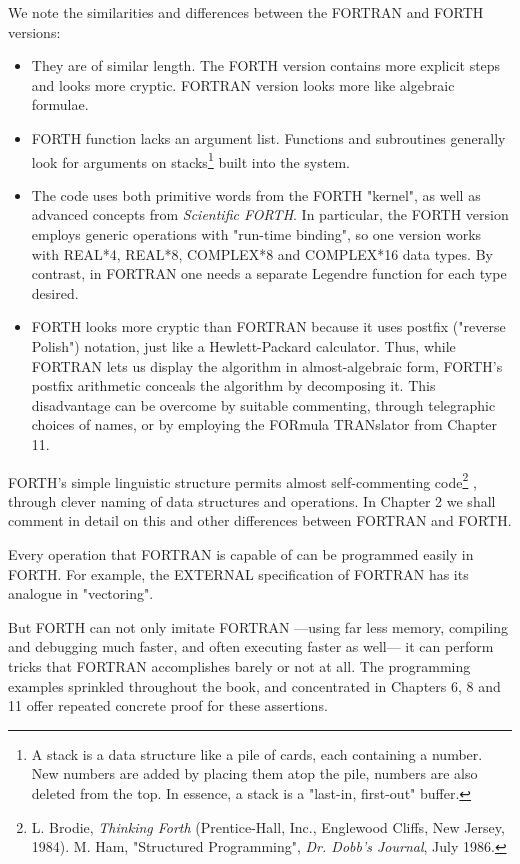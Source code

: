 We note the similarities and differences between the FORTRAN and FORTH versions:

\begin{itemize}
    \item They are of similar length. The FORTH version contains more explicit steps and looks more cryptic. FORTRAN version looks more like algebraic formulae.
    \item FORTH function lacks an argument list. Functions and subroutines generally look for arguments on stacks\footnote{A stack is a data structure like a pile of cards, each containing a number. New numbers are added by placing them atop the pile, numbers are also deleted from the top. In essence, a stack is a "last-in, first-out" buffer.} built into 
the system.
    \item The code uses both primitive words from the FORTH "kernel", as well as advanced concepts from \textit{Scientific FORTH}. In particular, the FORTH version employs generic operations with "run-time binding", so one version works with REAL*4, REAL*8, COMPLEX*8 and COMPLEX*16 data types. By contrast, in FORTRAN one needs a separate Legendre function for each type desired.
    \item FORTH looks more cryptic than FORTRAN because it uses postfix ("reverse Polish") notation, just like a Hewlett-Packard calculator. Thus, while FORTRAN lets us display the algorithm in almost-algebraic form, FORTH's postfix arithmetic conceals the algorithm by decomposing it. This disadvantage can be overcome by suitable commenting, through telegraphic choices of names, or by employing the FORmula TRANslator from Chapter 11.
\end{itemize}

FORTH's simple linguistic structure permits almost self-commenting code\footnote{L. Brodie, \textit{Thinking Forth} (Prentice-Hall, Inc., Englewood Cliffs, New Jersey, 1984). M. Ham, "Structured Programming", \textit{Dr. Dobb's Journal}, July 1986.} , through clever naming of data structures and operations. In Chapter 2 we shall comment in detail on this and other differences between FORTRAN and FORTH.
 
Every operation that FORTRAN is capable of can be programmed easily in FORTH. For example, the EXTERNAL specification of FORTRAN has its analogue in "vectoring".

But FORTH can not only imitate FORTRAN —using far less memory, compiling and debugging much faster, and often executing faster as well— it can perform tricks that FORTRAN accomplishes barely or not at all. The programming examples sprinkled throughout the book, and concentrated in Chapters 6, 8 and 11 offer repeated concrete proof for these assertions.

